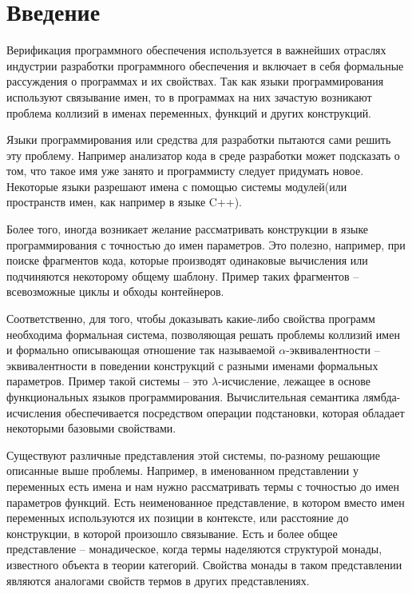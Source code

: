 \section*{Введение}

Верификация программного обеспечения используется в важнейших отраслях индустрии разработки программного обеспечения и включает в себя формальные рассуждения о программах и их свойствах. Так как языки программирования используют связывание имен, то в программах на них зачастую возникают проблема коллизий в именах переменных, функций и других конструкций.

Языки программирования или средства для разработки пытаются сами решить эту проблему. Например анализатор кода в среде разработки может подсказать о том, что такое имя уже занято и программисту следует придумать новое. Некоторые языки разрешают имена с помощью системы модулей(или пространств имен, как например в языке C++).

Более того, иногда возникает желание рассматривать конструкции в языке программирования с точностью до имен параметров. Это полезно, например, при поиске фрагментов кода, которые производят одинаковые вычисления или подчиняются некоторому общему шаблону. Пример таких фрагментов -- всевозможные циклы и обходы контейнеров.

Соответственно, для того, чтобы доказывать какие-либо свойства программ необходима формальная система, позволяющая решать проблемы коллизий имен и формально описывающая отношение так называемой $\alpha$-эквивалентности -- эквивалентности в поведении конструкций с разными именами формальных параметров. Пример такой системы -- это $\lambda$-исчисление, лежащее в основе функциональных языков программирования. Вычислительная семантика лямбда-исчисления обеспечивается посредством операции подстановки, которая обладает некоторыми базовыми свойствами.

Существуют различные представления этой системы, по-разному решающие описанные выше проблемы. Например, в именованном представлении у переменных есть имена и нам нужно рассматривать термы с точностью до имен параметров функций. Есть неименованное представление, в котором вместо имен переменных используются их позиции в контексте, или расстояние до конструкции, в которой произошло связывание. Есть и более общее представление -- монадическое, когда термы наделяются структурой монады, известного объекта в теории категорий. Свойства монады в таком представлении являются аналогами свойств термов в других представлениях.

